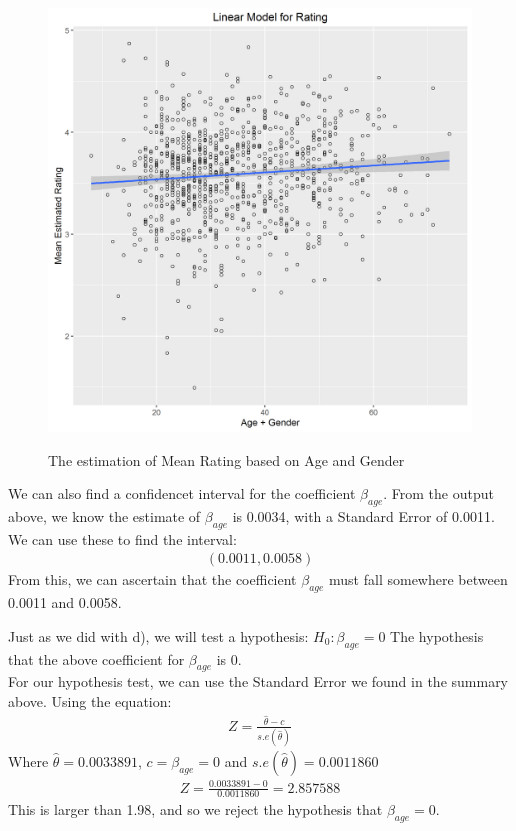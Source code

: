 \documentclass[11pt]{article}  %
\begin{document}
\begin{enumerate}
    \begin{figure}[h]
    \centering
    \caption{The estimation of Mean Rating based on Age and Gender}
    \includegraphics[scale=.50]{regression}
    \label{fig:regres}
    \end{figure}
    
    We can also find a confidencet interval for the coefficient $\beta_{age}$. From the output above, we know the estimate of $\beta_{age}$ is 0.0034, with a Standard Error of 0.0011. We can use these to find the interval:
    \begin{align*}
        (0.0011, 0.0058)
    \end{align*}
    From this, we can ascertain that the coefficient $\beta_{age}$ must fall somewhere between 0.0011 and 0.0058.
    
    Just as we did with d), we will test a hypothesis: $H_0 : \beta_{age} = 0$ The hypothesis that the above coefficient for $\beta_{age}$ is 0.\\
    For our hypothesis test, we can use the Standard Error we found in the summary above.
    Using the equation:
    \begin{align*}
        Z = \frac{\hat{\theta} - c}{s.e(\hat{\theta})}
    \end{align*}
    Where $\hat{\theta} = 0.0033891$, $c = \beta_{age} = 0$ and $s.e(\hat{\theta}) = 0.0011860$
    \begin{align*}
        Z = \frac{0.0033891 - 0}{0.0011860} = 2.857588
    \end{align*}
    This is larger than 1.98, and so we reject the hypothesis that $\beta_{age} = 0$.
    

\end{enumerate}
\end{document}

